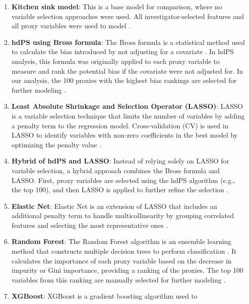\documentclass[sn-vancouver,Numbered,lineno,pdflatex]{sn-jnl}
\begin{document}
\begin{enumerate}
\def\labelenumi{\arabic{enumi}.}
\item
  \textbf{Kitchen sink model}: This is a base model for comparison,
  where no variable selection approaches were used. All
  investigator-selected features and all proxy variables were used to
  model \citep{karim2018can}.
\item
  \textbf{hdPS using Bross formula}: The Bross formula is a statistical
  method used to calculate the bias introduced by not adjusting for a
  covariate \citep{bross1966spurious}. In hdPS analysis, this formula
  was originally applied to each proxy variable to measure and rank the
  potential bias if the covariate were not adjusted for. In our
  analysis, the 100 proxies with the highest bias rankings are selected
  for further modeling \citep{schneeweiss2009high, wyss2018erratum}.
\item
  \textbf{Least Absolute Shrinkage and Selection Operator (LASSO)}:
  LASSO is a variable selection technique that limits the number of
  variables by adding a penalty term to the regression model.
  Cross-validation (CV) is used in LASSO to identify variables with
  non-zero coefficients in the best model by optimizing the penalty
  value
  \citep{franklin2015regularized, schneeweiss2017variable, karim2018can}.
\item
  \textbf{Hybrid of hdPS and LASSO}: Instead of relying solely on LASSO
  for variable selection, a hybrid approach combines the Bross formula
  and LASSO. First, proxy variables are selected using the hdPS
  algorithm (e.g., the top 100), and then LASSO is applied to further
  refine the selection \citep{karim2018can, franklin2015regularized}.
\item
  \textbf{Elastic Net}: Elastic Net is an extension of LASSO that
  includes an additional penalty term to handle multicollinearity by
  grouping correlated features and selecting the most representative
  ones \citep{karim2018can}.
\item
  \textbf{Random Forest}: The Random Forest algorithm is an ensemble
  learning method that constructs multiple decision trees to perform
  classification \citep{breiman2001random}. It calculates the importance
  of each proxy variable based on the decrease in impurity or Gini
  importance, providing a ranking of the proxies. The top 100 variables
  from this ranking are manually selected for further modeling
  \citep{schneeweiss2017variable}.
\item
  \textbf{XGBoost}: XGBoost is a gradient boosting algorithm used to

\end{enumerate}
\end{document}
